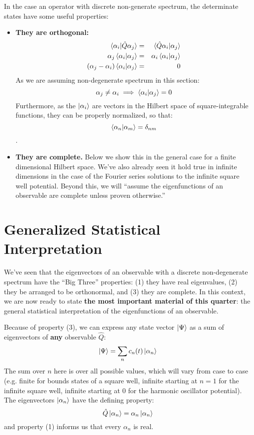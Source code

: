 \documentclass[12pt]{book}
\begin{document}
In the case an operator with discrete non-generate spectrum, the determinate states have some useful properties:

\begin{itemize} 
\item {\bf They are orthogonal:}  
\begin{eqnarray*}
\braket{\alpha_i | \hat{Q} \alpha_j} &=& \braket{\hat{Q} \alpha_i | \alpha_j}\\
\alpha_j \braket{\alpha_i | \alpha_j} &=& \alpha_i \braket{\alpha_i | \alpha_j}\\
(\alpha_j-\alpha_i) \braket{\alpha_i | \alpha_j} &=& 0\\
\end{eqnarray*}
As we are assuming non-degenerate spectrum in this section:
$$\alpha_j \neq \alpha_i \implies \braket{\alpha_i | \alpha_j} = 0$$
Furthermore, as the $\ket{\alpha_i}$ are vectors in the Hilbert space of square-integrable functions,
they can be properly normalized, so that:
$$\braket{\alpha_n|\alpha_m} = \delta_{nm}$$.

\item {\bf They are complete.}  Below we show this in the general case for a finite dimensional Hilbert space.  We've also already seen it hold true in infinite dimensions in the case of the Fourier series solutions to the infinite square well potential.  Beyond this, we will ``assume the eigenfunctions of an observable are complete unless proven otherwise.'' 
\end{itemize}

\section{Generalized Statistical Interpretation}

We've seen that the eigenvectors of an observable with a discrete non-degenerate spectrum have the ``Big Three'' properties:  (1) they have real eigenvalues, (2) they be arranged to be orthonormal, and (3) they are complete.  In this context, we are now ready to state {\bf the most important material of this quarter}:  the general statistical interpretation of the eigenfunctions of an observable.

Because of property (3), we can express any state vector $\ket{\Psi}$ as a sum of eigenvectors of {\bf any} observable $\hat{Q}$:
\begin{equation}
\label{eqn:sumeigen}
\ket{\Psi} = \sum_n c_n(t) \ket{\alpha_n}
\end{equation}
The sum over $n$ here is over all possible values, which will vary from case to case (e.g. finite for bounds states of a square well, infinite starting at $n=1$ for the infinite square well, infinite starting at $0$ for the harmonic oscillator potential).  The eigenvectors $\ket{\alpha_n}$ have the defining property:
$$\hat{Q} \ket{\alpha_n} = \alpha_n \ket{\alpha_n}$$
and property (1) informs us that every $\alpha_n$ is real.  
\end{document}
